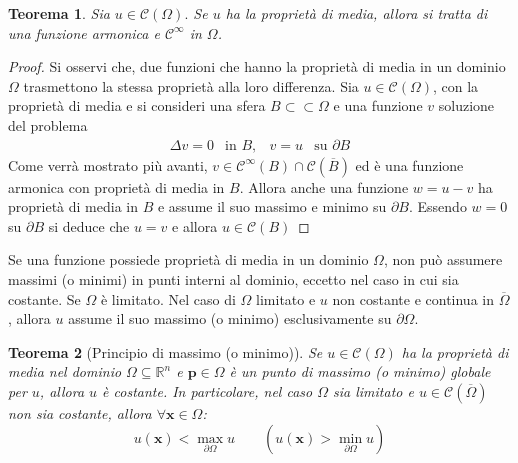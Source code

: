 \documentclass[a4paper,12pt, draft]{article}
\theoremstyle{break}
\newtheorem{theorem}{Teorema}[section]
\numberwithin{equation}{section}
\begin{document}
\begin{theorem}
  Sia \(u \in \mathcal{C}(\Omega).\) Se \(u\) ha la proprietà di media, allora si tratta di una funzione armonica e \(\mathcal{C}^{\infty}\) in \(\Omega\).
\end{theorem}
\begin{proof}
  Si osservi che, due funzioni che hanno la proprietà di media in un dominio \(\Omega\) trasmettono la stessa proprietà alla loro differenza. Sia \(u \in \mathcal{C}(\Omega)\), con la proprietà di media e si consideri una sfera \(B \subset \subset \Omega\) e una funzione \(v\) soluzione del problema 
  \[
    \begin{array}{cccc}
      \Delta v = 0 & \mbox{in }B, & v = u & \mbox{su }\partial B
    \end{array}
  \]
  Come verrà mostrato più avanti, \(v \in \mathcal{C}^{\infty}(B)\cap \mathcal{C}(\overline{B})\) ed è una funzione armonica con proprietà di media in \(B\). Allora anche una funzione \(w  = u - v\) ha proprietà di media in \(B\) e assume il suo massimo e minimo su \(\partial B\). Essendo \(w = 0\) su \(\partial B\) si deduce che \(u = v\) e allora \(u \in \mathcal{C}(B)\)

\end{proof}
Se una funzione possiede proprietà di media in un dominio \(\Omega\), non può assumere massimi (o minimi) in punti interni al dominio, eccetto nel caso in cui sia costante. Se \(\Omega\) è limitato. Nel caso di \(\Omega\) limitato e \(u\) non costante e continua in \(\overline{\Omega}\), allora \(u\) assume il suo massimo (o minimo) esclusivamente su \(\partial \Omega\).
\begin{theorem}[Principio di massimo (o minimo)]
  Se \(u \in \mathcal{C}(\Omega)\) ha la proprietà di media nel dominio \(\Omega \subseteq \mathbb{R}^n\) e \(\bm{p} \in \Omega\) è un punto di massimo (o minimo) globale per \(u\), allora \(u\) è costante. In particolare, nel caso \(\Omega\) sia limitato e \(u \in \mathcal{C}(\overline{\Omega})\) non sia costante, allora \(\forall \bm{x} \in \Omega\):
  \[
  u(\bm{x}) < \max_{\partial \Omega} u \qquad (u(\bm{x}) > \min_{\partial \Omega} u) 
  \]
\end{theorem}
\end{document}
